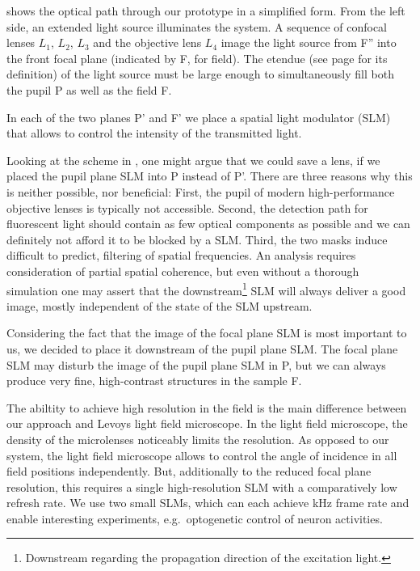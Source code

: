  shows the optical path through our prototype
in a simplified form.  From the left side, an extended light source
illuminates the system. A sequence of confocal lenses $L_1$, $L_2$,
$L_3$ and the objective lens $L_4$ image the light source from F''
into the front focal plane (indicated by F, for field). The etendue
(see page \pageref{sec:etendue} for its definition) of the light
source must be large enough to simultaneously fill both the pupil P as
well as the field F.

In each of the two planes P' and F' we place a spatial light modulator
(SLM) that allows to control the intensity of the transmitted light.

Looking at the scheme in , one might argue
that we could save a lens, if we placed the pupil plane SLM into P
instead of P'. There are three reasons why this is neither possible,
nor beneficial: First, the pupil of modern high-performance objective
lenses is typically not accessible. Second, the detection path for
fluorescent light should contain as few optical components as possible
and we can definitely not afford it to be blocked by a SLM.  Third,
the two masks induce  difficult to predict,
filtering of spatial frequencies. An analysis requires consideration
of partial spatial coherence, but even without a thorough simulation
one may assert that the downstream\footnote{Downstream regarding the
  propagation direction of the excitation light.} SLM will always
deliver a good image, mostly independent of the state of the SLM
upstream.

Considering the fact that the image of the focal plane SLM is most
important to us, we decided to place it downstream of the pupil plane
SLM. The focal plane SLM may disturb the image of the pupil plane SLM
in P, but we can always produce very fine, high-contrast structures in
the sample F.

The abiltity to achieve high resolution in the field is the main
difference between our approach and Levoys light field microscope.  In
the light field microscope, the density of the microlenses noticeably
limits the resolution. As opposed to our system, the light field
microscope allows to control the angle of incidence in all field
positions independently.  But, additionally to the reduced focal plane
resolution, this requires a single high-resolution SLM with a
comparatively low refresh rate. We use two small SLMs, which can each
achieve \unit[1]{kHz} frame rate and enable interesting experiments,
e.g.\ optogenetic control of neuron activities.

